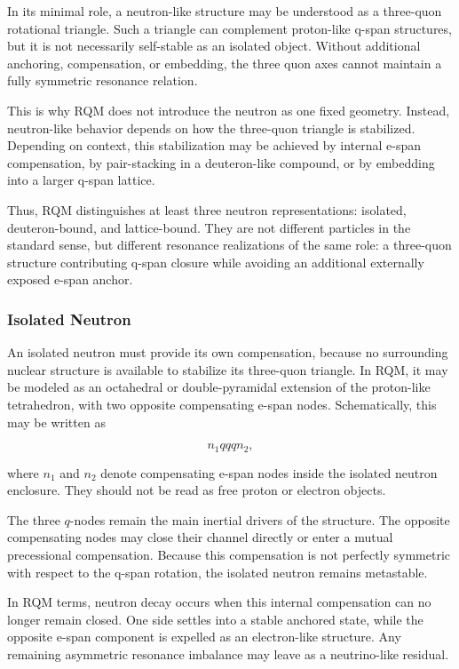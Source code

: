 \documentclass[11pt,a4paper]{article}
\begin{document}
In its minimal role, a neutron-like structure may be understood as a three-quon rotational triangle. Such a triangle can complement proton-like q-span structures, but it is not necessarily self-stable as an isolated object. Without additional anchoring, compensation, or embedding, the three quon axes cannot maintain a fully symmetric resonance relation.

This is why RQM does not introduce the neutron as one fixed geometry. Instead, neutron-like behavior depends on how the three-quon triangle is stabilized. Depending on context, this stabilization may be achieved by internal e-span compensation, by pair-stacking in a deuteron-like compound, or by embedding into a larger q-span lattice.

Thus, RQM distinguishes at least three neutron representations: isolated, deuteron-bound, and lattice-bound. They are not different particles in the standard sense, but different resonance realizations of the same role: a three-quon structure contributing q-span closure while avoiding an additional externally exposed e-span anchor.



\subsubsection{Isolated Neutron}

An isolated neutron must provide its own compensation, because no surrounding nuclear structure is available to stabilize its three-quon triangle. In RQM, it may be modeled as an octahedral or double-pyramidal extension of the proton-like tetrahedron, with two opposite compensating e-span nodes. Schematically, this may be written as

\[
n_1 q q q n_2 ,
\]

where \(n_1\) and \(n_2\) denote compensating e-span nodes inside the isolated neutron enclosure. They should not be read as free proton or electron objects.

The three \(q\)-nodes remain the main inertial drivers of the structure. The opposite compensating nodes may close their channel directly or enter a mutual precessional compensation. Because this compensation is not perfectly symmetric with respect to the q-span rotation, the isolated neutron remains metastable.

In RQM terms, neutron decay occurs when this internal compensation can no longer remain closed. One side settles into a stable anchored state, while the opposite e-span component is expelled as an electron-like structure. Any remaining asymmetric resonance imbalance may leave as a neutrino-like residual.
\end{document}
